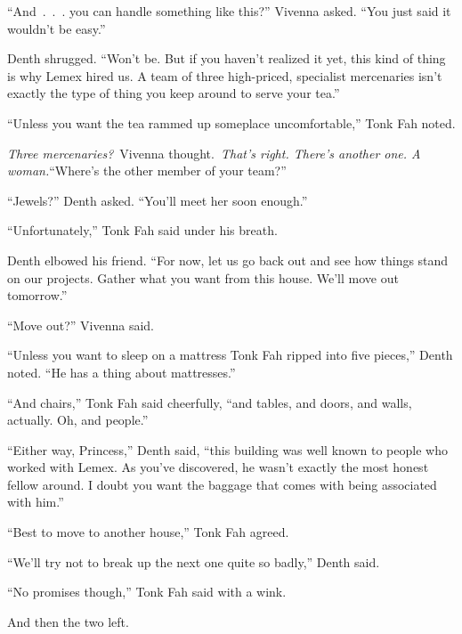 “And~.~.~. you can handle something like this?” Vivenna asked. “You just said it wouldn’t be easy.”

Denth shrugged. “Won’t be. But if you haven’t realized it yet, this kind of thing is why Lemex hired us. A team of three high-priced, specialist mercenaries isn’t exactly the type of thing you keep around to serve your tea.”

“Unless you want the tea rammed up someplace uncomfortable,” Tonk Fah noted.

\textit{Three mercenaries?}~Vivenna thought.~\textit{That’s right. There’s another one. A woman.}“Where’s the other member of your team?”

“Jewels?” Denth asked. “You’ll meet her soon enough.”

“Unfortunately,” Tonk Fah said under his breath.

Denth elbowed his friend. “For now, let us go back out and see how things stand on our projects. Gather what you want from this house. We’ll move out tomorrow.”

“Move out?” Vivenna said.

“Unless you want to sleep on a mattress Tonk Fah ripped into five pieces,” Denth noted. “He has a thing about mattresses.”

“And chairs,” Tonk Fah said cheerfully, “and tables, and doors, and walls, actually. Oh, and people.”

“Either way, Princess,” Denth said, “this building was well known to people who worked with Lemex. As you’ve discovered, he wasn’t exactly the most honest fellow around. I doubt you want the baggage that comes with being associated with him.”

“Best to move to another house,” Tonk Fah agreed.

“We’ll try not to break up the next one quite so badly,” Denth said.

“No promises though,” Tonk Fah said with a wink.

And then the two left.

